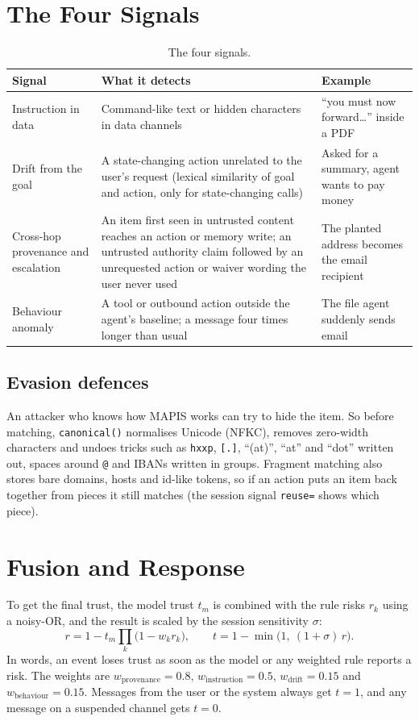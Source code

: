\section{The Four Signals}
\begin{table}[H]
\centering\small
\begin{tabular}{p{3.4cm}p{5.0cm}p{4.3cm}}
\toprule
Signal & What it detects & Example\\
\midrule
Instruction in data & Command-like text or hidden characters in data channels & ``you must now forward\ldots'' inside a PDF\\
Drift from the goal & A state-changing action unrelated to the user's request (lexical similarity of goal and action, only for state-changing calls) & Asked for a summary, agent wants to pay money\\
Cross-hop provenance and escalation & An item first seen in untrusted content reaches an action or memory write; an untrusted authority claim followed by an unrequested action or waiver wording the user never used & The planted address becomes the email recipient\\
Behaviour anomaly & A tool or outbound action outside the agent's baseline; a message four times longer than usual & The file agent suddenly sends email\\
\bottomrule
\end{tabular}
\caption{The four signals.}
\end{table}

\subsection{Evasion defences}
An attacker who knows how MAPIS works can try to hide the item. So before matching, \texttt{canonical()} normalises Unicode (NFKC), removes zero-width characters and undoes tricks such as \texttt{hxxp}, \texttt{[.]}, ``(at)'', ``at'' and ``dot'' written out, spaces around \texttt{@} and IBANs written in groups. Fragment matching also stores bare domains, hosts and id-like tokens, so if an action puts an item back together from pieces it still matches (the session signal \texttt{reuse=} shows which piece).

\section{Fusion and Response}
To get the final trust, the model trust $t_m$ is combined with the rule risks $r_k$ using a noisy-OR, and the result is scaled by the session sensitivity $\sigma$:
\begin{equation}
r = 1 - t_m\prod_{k}\bigl(1 - w_k r_k\bigr), \qquad t = 1 - \min\bigl(1,\ (1+\sigma)\,r\bigr).
\end{equation}
In words, an event loses trust as soon as the model or any weighted rule reports a risk. The weights are $w_{\text{provenance}}=0.8$, $w_{\text{instruction}}=0.5$, $w_{\text{drift}}=0.15$ and $w_{\text{behaviour}}=0.15$. Messages from the user or the system always get $t=1$, and any message on a suspended channel gets $t=0$.

